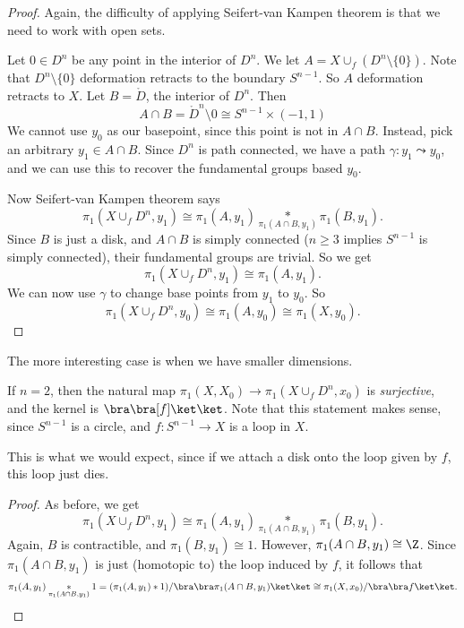 \documentclass[a4paper]{article}
\begin{document}
\begin{proof}
  Again, the difficulty of applying Seifert-van Kampen theorem is that we need to work with open sets.

  Let $0 \in D^n$ be any point in the interior of $D^n$. We let $A = X\cup_f (D^n \setminus \{0\})$. Note that $D^n \setminus \{0\}$ deformation retracts to the boundary $S^{n - 1}$. So $A$ deformation retracts to $X$. Let $B = \mathring{D}$, the interior of $D^n$. Then
  \[
    A\cap B = \mathring{D}^n \setminus 0 \cong S^{n - 1}\times (-1, 1)
  \]
  We cannot use $y_0$ as our basepoint, since this point is not in $A\cap B$. Instead, pick an arbitrary $y_1 \in A\cap B$. Since $D^n$ is path connected, we have a path $\gamma: y_1 \leadsto y_0$, and we can use this to recover the fundamental groups based $y_0$.

  Now Seifert-van Kampen theorem says
  \[
    \pi_1(X\cup_f D^n, y_1) \cong \pi_1(A, y_1) \underset{\pi_1(A\cap B, y_1)}{*} \pi_1(B, y_1).
  \]
  Since $B$ is just a disk, and $A\cap B$ is simply connected ($n \geq 3$ implies $S^{n - 1}$ is simply connected), their fundamental groups are trivial. So we get
  \[
    \pi_1(X\cup_f D^n, y_1) \cong \pi_1(A, y_1).
  \]
  We can now use $\gamma$ to change base points from $y_1$ to $y_0$. So
  \[
    \pi_1(X\cup_f D^n, y_0) \cong \pi_1(A, y_0) \cong \pi_1(X, y_0).
  \]
\end{proof}
The more interesting case is when we have smaller dimensions.
\begin{thm}
  If $n = 2$, then the natural map $\pi_1(X, X_0) \to \pi_1(X\cup_f D^n, x_0)$ is \emph{surjective}, and the kernel is $\bra\bra [f] \ket \ket$. Note that this statement makes sense, since $S^{n - 1}$ is a circle, and $f: S^{n - 1} \to X$ is a loop in $X$.
\end{thm}
This is what we would expect, since if we attach a disk onto the loop given by $f$, this loop just dies.

\begin{proof}
  As before, we get
  \[
    \pi_1(X\cup_f D^n, y_1) \cong \pi_1(A, y_1) \underset{\pi_1(A\cap B, y_1)}{*} \pi_1(B, y_1).
  \]
  Again, $B$ is contractible, and $\pi_1(B, y_1) \cong 1$. However, $\pi_1(A\cap B, y_1) \cong \Z$. Since $\pi_1(A\cap B, y_1)$ is just (homotopic to) the loop induced by $f$, it follows that
  \[
    \pi_1(A, y_1) \underset{\pi_1(A\cap B, y_1)}{*} 1 = (\pi_1(A, y_1) * 1)/\bra \bra \pi_1(A\cap B, y_1)\ket \ket \cong \pi_1(X, x_0)/\bra \bra f\ket\ket.
  \]
\end{proof}
\end{document}
